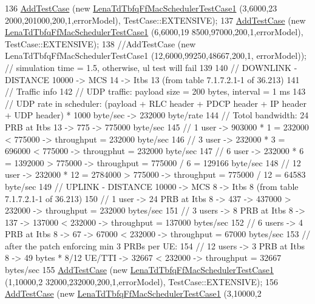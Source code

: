 \begin{DoxyCode}
136   \hyperlink{classns3_1_1TestCase_a3718088e3eefd5d6454569d2e0ddd835}{AddTestCase} (\textcolor{keyword}{new} \hyperlink{classLenaTdTbfqFfMacSchedulerTestCase1}{LenaTdTbfqFfMacSchedulerTestCase1} (3,6000,23
      2000,201000,200,1,errorModel), TestCase::EXTENSIVE);
137   \hyperlink{classns3_1_1TestCase_a3718088e3eefd5d6454569d2e0ddd835}{AddTestCase} (\textcolor{keyword}{new} \hyperlink{classLenaTdTbfqFfMacSchedulerTestCase1}{LenaTdTbfqFfMacSchedulerTestCase1} (6,6000,19
      8500,97000,200,1,errorModel), TestCase::EXTENSIVE);
138   \textcolor{comment}{//AddTestCase (new LenaTdTbfqFfMacSchedulerTestCase1 (12,6000,99250,48667,200,1, errorModel)); //
       simulation time = 1.5, otherwise, ul test will fail}
139 
140   \textcolor{comment}{// DOWNLINK - DISTANCE 10000 -> MCS 14 -> Itbs 13 (from table 7.1.7.2.1-1 of 36.213)}
141   \textcolor{comment}{// Traffic info}
142   \textcolor{comment}{//   UDP traffic: payload size = 200 bytes, interval = 1 ms}
143   \textcolor{comment}{//   UDP rate in scheduler: (payload + RLC header + PDCP header + IP header + UDP header) * 1000 byte/sec
       -> 232000 byte/rate }
144   \textcolor{comment}{// Totol bandwidth: 24 PRB at Itbs 13 -> 775 -> 775000 byte/sec}
145   \textcolor{comment}{// 1 user -> 903000 * 1 = 232000 < 775000 -> throughput = 232000 byte/sec}
146   \textcolor{comment}{// 3 user -> 232000 * 3 = 696000 < 775000 -> througphut = 232000 byte/sec}
147   \textcolor{comment}{// 6 user -> 232000 * 6 = 1392000 > 775000 -> throughput = 775000 / 6 = 129166 byte/sec}
148   \textcolor{comment}{// 12 user -> 232000 * 12 = 2784000 > 775000 -> throughput =  775000 / 12 = 64583 byte/sec}
149   \textcolor{comment}{// UPLINK - DISTANCE 10000 -> MCS 8 -> Itbs 8 (from table 7.1.7.2.1-1 of 36.213)}
150   \textcolor{comment}{// 1 user -> 24 PRB at Itbs 8 -> 437 -> 437000 > 232000 -> throughput = 232000 bytes/sec}
151   \textcolor{comment}{// 3 users -> 8 PRB at Itbs 8 -> 137 -> 137000 < 232000 -> throughput = 137000 bytes/sec}
152   \textcolor{comment}{// 6 users -> 4 PRB at Itbs 8 -> 67 -> 67000 < 232000 -> throughput = 67000 bytes/sec}
153   \textcolor{comment}{// after the patch enforcing min 3 PRBs per UE:}
154   \textcolor{comment}{// 12 users -> 3 PRB at Itbs 8 -> 49 bytes * 8/12 UE/TTI -> 32667 < 232000 -> throughput = 32667 
       bytes/sec}
155   \hyperlink{classns3_1_1TestCase_a3718088e3eefd5d6454569d2e0ddd835}{AddTestCase} (\textcolor{keyword}{new} \hyperlink{classLenaTdTbfqFfMacSchedulerTestCase1}{LenaTdTbfqFfMacSchedulerTestCase1} (1,10000,2
      32000,232000,200,1,errorModel), TestCase::EXTENSIVE);
156   \hyperlink{classns3_1_1TestCase_a3718088e3eefd5d6454569d2e0ddd835}{AddTestCase} (\textcolor{keyword}{new} \hyperlink{classLenaTdTbfqFfMacSchedulerTestCase1}{LenaTdTbfqFfMacSchedulerTestCase1} (3,10000,2

\end{DoxyCode}
